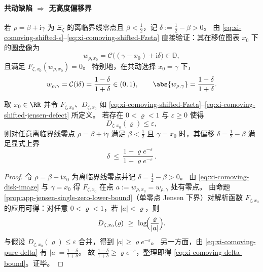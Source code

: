 

\paragraph{共动缺陷 \texorpdfstring{$\Rightarrow$}{=>} 无高度偏移界}
若 \(\rho=\beta+\mathrm{i}\gamma\) 为 \(\Xi_{\zeta}\) 的离临界线零点且 \(\beta<\tfrac12\)，记 \(\delta:=\tfrac12-\beta>0\)。
由 \eqref{eq:xi-comoving-shifted-s}--\eqref{eq:xi-comoving-shifted-Fzeta} 直接验证：其在移位图表 \(x_0\) 下的圆盘像为
\begin{equation}\label{eq:xi-comoving-disk-image}
w_{\rho,x_0}=\mathcal{C}\bigl((\gamma-x_0)+\mathrm{i}\delta\bigr)\in\mathbb{D},
\end{equation}
且满足 \(F_{\zeta,x_0}(w_{\rho,x_0})=0\)。
特别地，在共动选择 \(x_0=\gamma\) 下，
\begin{equation}\label{eq:xi-comoving-pure-delta}
w_{\rho,\gamma}=\mathcal{C}(\mathrm{i}\delta)=\frac{1-\delta}{1+\delta}\in(0,1),
\qquad
\abs{w_{\rho,\gamma}}=\frac{1-\delta}{1+\delta}.
\end{equation}



\begin{theorem}[共动缺陷界导出无高度偏移界]\label{thm:xi-comoving-defect-implies-delta-bound}
取 \(x_0\in\RR\) 并令 \(F_{\zeta,x_0}\)、\(D_{\zeta,x_0}\) 如 \eqref{eq:xi-comoving-shifted-Fzeta}--\eqref{eq:xi-comoving-shifted-jensen-defect} 所定义。
若存在 \(0<\varrho<1\) 与 \(\varepsilon\ge 0\) 使得
\[
D_{\zeta,x_0}(\varrho)\le \varepsilon,
\]
则对任意离临界线零点 \(\rho=\beta+\mathrm{i}\gamma\) 满足 \(\beta<\tfrac12\) 且 \(\gamma=x_0\) 时，其偏移 \(\delta=\tfrac12-\beta\) 满足显式上界
\begin{equation}\label{eq:xi-comoving-delta-bound}
\boxed{\;
\delta\ \le\ \frac{1-\varrho e^{-\varepsilon}}{1+\varrho e^{-\varepsilon}}\,.
\;}
\end{equation}
\end{theorem}

\begin{proof}
令 \(\rho=\beta+\mathrm{i}x_0\) 为离临界线零点并记 \(\delta=\tfrac12-\beta>0\)。
由 \eqref{eq:xi-comoving-disk-image} 与 \(\gamma=x_0\) 得 \(F_{\zeta,x_0}\) 在点 \(a:=w_{\rho,x_0}=w_{\rho,\gamma}\) 处有零点。
由命题 \ref{prop:app-jensen-single-zero-lower-bound}（单零点 Jensen 下界）对解析函数 \(F_{\zeta,x_0}\) 的应用可得：对任意 \(0<\varrho<1\)，若 \(|a|<\varrho\)，则
\[
D_{\zeta,x_0}(\varrho)\ \ge\ \log\!\Bigl(\frac{\varrho}{|a|}\Bigr).
\]
与假设 \(D_{\zeta,x_0}(\varrho)\le\varepsilon\) 合并，得到 \(|a|\ge \varrho e^{-\varepsilon}\)。
另一方面，由 \eqref{eq:xi-comoving-pure-delta} 有 \(|a|=\frac{1-\delta}{1+\delta}\)。
故
\(
\frac{1-\delta}{1+\delta}\ge \varrho e^{-\varepsilon}
\)，整理即得 \eqref{eq:xi-comoving-delta-bound}。证毕。
\end{proof}

